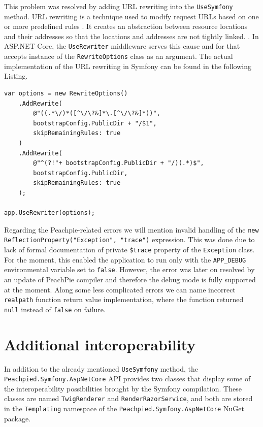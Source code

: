 This problem was resolved by adding URL rewriting into the \texttt{UseSymfony} method. URL rewriting is a technique used to modify request URLs based on one or more predefined rules \citep{microsoft.docs}. It creates an abstraction between resource locations and their addresses so that the locations and addresses are not tightly linked. \citep{microsoft.docs}. In ASP.NET Core, the \texttt{UseRewriter} middleware serves this cause and for that accepts instance of the \texttt{RewriteOptions} class as an argument. The actual implementation of the URL rewriting in Symfony can be found in the following Listing.

\begin{center}
\begin{lstlisting}[caption={Symfony URL rewritting middleware},captionpos=b]
var options = new RewriteOptions()
    .AddRewrite(
        @"((.*\/)*([^\/\?&]*\.[^\/\?&]*))",
        bootstrapConfig.PublicDir + "/$1",
        skipRemainingRules: true
    )
    .AddRewrite(
        @"^(?!"+ bootstrapConfig.PublicDir + "/)(.*)$", 
        bootstrapConfig.PublicDir, 
        skipRemainingRules: true
    );

app.UseRewriter(options);
\end{lstlisting}
\end{center}

Regarding the Peachpie-related errors we will mention invalid handling of the \texttt{new ReflectionProperty("Exception", "trace")} expression. This was done due to lack of formal documentation of private \texttt{\$trace} property of the \texttt{Exception} class. For the moment, this enabled the application to run only with the \texttt{APP\_DEBUG} environmental variable set to \texttt{false}. However, the error was later on resolved by an update of PeachPie compiler and therefore the debug mode is fully supported at the moment. Along some less complicated errors we can name incorrect \texttt{realpath} function return value implementation, where the function returned \texttt{null} instead of \texttt{false} on failure.


\section{Additional interoperability}
In addition to the already mentioned \texttt{UseSymfony} method, the \texttt{Peachpied.Symfony.AspNetCore} API provides two classes that display some of the interoperability possibilities brought by the Symfony compilation. These classes are named \texttt{TwigRenderer} and \texttt{RenderRazorService}, and both are stored in the \texttt{Templating} namespace of the \texttt{Peachpied.Symfony.AspNetCore} NuGet package.

